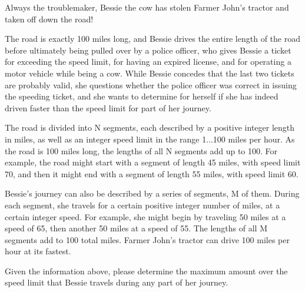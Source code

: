 Always the troublemaker, Bessie the cow has stolen Farmer John's tractor and taken off down the road! 

The road is exactly 100 miles long, and Bessie drives the entire length of the road before ultimately being pulled over by a police officer, who gives Bessie a ticket for exceeding the speed limit, for having an expired license, and for operating a motor vehicle while being a cow.  While Bessie concedes that the last two tickets are probably valid, she questions whether the police officer was correct in issuing the speeding ticket, and she wants to determine for herself if she has indeed driven faster than the speed limit for part of her journey.

The road is divided into N segments, each described by a positive integer length in miles, as well as an integer speed limit in the range 1...100 miles per hour.  As the road is 100 miles long, the lengths of all N segments add up to 100.  For example, the road might start with a segment of length 45 miles, with speed limit 70, and then it might end with a segment of length 55 miles, with speed limit 60.

Bessie's journey can also be described by a series of segments, M of them.  During each segment, she travels for a certain positive integer number of miles, at a certain integer speed.  For example, she might begin by traveling 50 miles at a speed of 65, then another 50 miles at a speed of 55.  The lengths of all M segments add to 100 total miles.  Farmer John's tractor can drive 100 miles per hour at its fastest.

Given the information above, please determine the maximum amount over the speed limit that Bessie travels during any part of her journey.